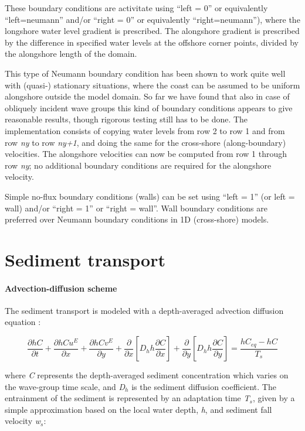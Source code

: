 These boundary conditions are activitate using ``left = 0'' or equivalently ``left=neumann'' and/or ``right = 0'' or equivalently ``right=neumann''), where the longshore water level gradient is prescribed. The alongshore gradient is prescribed by the difference in specified water levels at the offshore corner points, divided by the alongshore length of the domain. 

This type of Neumann boundary condition has been shown to work quite well with (quasi-) stationary situations, where the coast can be assumed to be uniform alongshore outside the model domain. So far we have found that also in case of obliquely incident wave groups this kind of boundary conditions appears to give reasonable results, though rigorous testing still has to be done. The implementation consists of copying water levels from row 2 to row 1 and from row \textit{ny} to row \textit{ny+1}, and doing the same for the cross-shore (along-boundary) velocities. The alongshore velocities can now be computed from row 1 through row \textit{ny}; no additional boundary conditions are required for the alongshore velocity.

Simple no-flux boundary conditions (walls) can be set using ``left = 1'' (or left = wall) and/or ``right = 1'' or ``right = wall''. Wall boundary conditions are preferred over Neumann boundary conditions in 1D (cross-shore) models.


\section{Sediment transport}
\paragraph{Advection-diffusion scheme}

The sediment transport is modeled with a depth-averaged advection diffusion equation \citep{Galappatti1985}:

\begin{equation} \label{2.57)} 
\frac{\partial hC}{\partial t} +\frac{\partial hCu^{E} }{\partial x} +\frac{\partial hCv^{E} }{\partial y} +\frac{\partial }{\partial x} \left[D_{h} h\frac{\partial C}{\partial x} \right]+\frac{\partial }{\partial y} \left[D_{h} h\frac{\partial C}{\partial y} \right]=\frac{hC_{eq} -hC}{T_{s} }  
\end{equation} 

where \textit{C }represents the depth-averaged sediment concentration which varies on the wave-group time scale, and \textit{D${}_{h}$} is the sediment diffusion coefficient. The entrainment of the sediment is represented by an adaptation time \textit{T${}_{s}$}, given by a simple approximation based on the local water depth, \textit{h}, and sediment fall velocity \textit{w${}_{s}$}:


